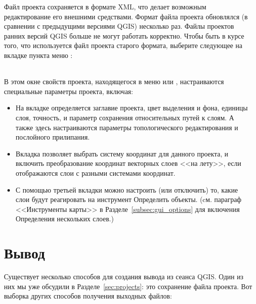 Файл проекта сохраняется в формате XML, что делает возможным редактирование
его внешними средствами. Формат файла проекта обновлялся (в сравнении с
предыдущими версиями QGIS) несколько раз. Файлы проектов ранних версий
QGIS больше не могут работать корректно. Чтобы быть в курсе того, что
используется файл проекта старого формата, выберите следующее на вкладке
 пункта меню  \arrow {}: \\

 \\

В этом окне свойств проекта, находящегося в меню  или , настраиваются специальные параметры
проекта, включая:

\begin{itemize}
\item На вкладке  определяется заглавие проекта, цвет выделения
и фона, единицы слоя, точность, и параметр сохранения относительных путей
к слоям. А также здесь настраиваются параметры топологического редактирования
и послойного прилипания.
\item Вкладка  позволяет выбрать систему координат
для данного проекта, и включить преобразование координат векторных слоев
<<на лету>>, если отображаются слои с разными системами координат.
\item С помощью третьей вкладки  можно настроить
(или отключить) то, какие слои будут реагировать на инструмент Определить
объекты. (cм. параграф <<Инструменты карты>> в Разделе~\ref{subsec:gui_options}
для включения Определения нескольких слоев.)
\end{itemize}

\section{Вывод}\label{sec:output}

Существует несколько способов для создания вывода из сеанса QGIS. Один из
них мы уже обсудили в Разделе~\ref{sec:projects}: это сохранение файла
проекта. Вот выборка других способов получения выходных файлов:

